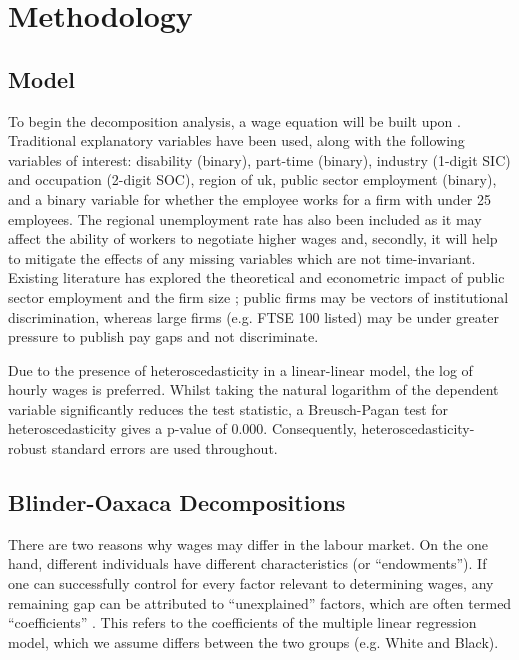 \documentclass[class=article, crop=false]{standalone}
\begin{document}
\section{Methodology}
\label{sec:Methodology}
\subsection{Model}
\label{sec:Model}
To begin the decomposition analysis, a wage equation will be built upon \citet{MincerA}. Traditional explanatory variables have been used, along with the following variables of interest: disability (binary), part-time (binary), industry (1-digit SIC) and occupation (2-digit SOC), region of \acrshort{uk}, public sector employment (binary), and a binary variable for whether the employee works for a firm with under 25 employees. The regional unemployment rate has also been included as it may affect the ability of workers to negotiate higher wages \citep{Bell} and, secondly, it will help to mitigate the effects of any missing variables which are not time-invariant. Existing literature has explored the theoretical and econometric impact of public sector employment and the firm size \citep{Longhi, Longhi3}; public firms may be vectors of institutional discrimination, whereas large firms (e.g. FTSE 100 listed) may be under greater pressure to publish pay gaps and not discriminate. %

Due to the presence of heteroscedasticity in a linear-linear model, the log of hourly wages is preferred. Whilst taking the natural logarithm of the dependent variable significantly reduces the test statistic, a Breusch-Pagan test for heteroscedasticity gives a p-value of 0.000. Consequently, heteroscedasticity-robust standard errors are used throughout.

\subsection{Blinder-Oaxaca Decompositions}
\label{sec:B_O_Decomp}
There are two reasons why wages may differ in the labour market. On the one hand, different individuals have different characteristics (or \enquote{endowments}). If one can successfully control for every factor relevant to determining wages, any remaining gap can be attributed to \enquote{unexplained} factors, which are often termed \enquote{coefficients} \citep{Blinder}. This refers to the coefficients of the multiple linear regression model, which we assume differs between the two groups (e.g. White and Black). %
\end{document}
